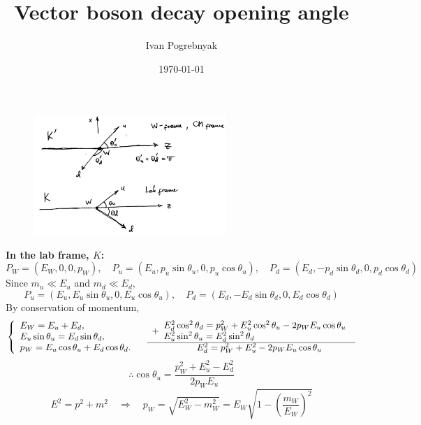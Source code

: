 \documentclass[12pt]{article}
\title{Vector boson decay opening angle}
\author{Ivan Pogrebnyak}
\date{\today}
\begin{document}
\maketitle

\begin{figure}[H]
  \centering
  \includegraphics[width=0.65\textwidth]{fig/fig.png}
\end{figure}

{\bf In the lab frame, $K$:}
\begin{equation}
  P_W = (E_W,0,0,p_W), \quad
  P_u = (E_u,p_u\sin\theta_u,0,p_u\cos\theta_u), \quad
  P_d = (E_d,-p_d\sin\theta_d,0,p_d\cos\theta_d)
\end{equation}
%
Since $m_u\ll E_u$ and $m_d\ll E_d$,
\begin{equation}
  P_u = (E_u,E_u\sin\theta_u,0,E_u\cos\theta_u), \quad
  P_d = (E_d,-E_d\sin\theta_d,0,E_d\cos\theta_d)
\end{equation}
%
By conservation of momentum,
\begin{equation}\label{eq:cons}
  \left\{\begin{array}{l}
    E_W = E_u + E_d, \\
    E_u\sin\theta_u = E_d\sin\theta_d, \\
    p_W = E_u\cos\theta_u + E_d\cos\theta_d.
  \end{array}\right.
  \quad
  \begin{array}{l}
    +\begin{array}{l}
      E_d^2\cos^2\theta_d = p_W^2 + E_u^2\cos^2\theta_u - 2p_WE_u\cos\theta_u \\
      E_u^2\sin^2\theta_u = E_d^2\sin^2\theta_d
    \end{array} \\
    \hline
    \hspace{17mm} E_d^2 = p_W^2 + E_u^2 - 2p_WE_u\cos\theta_u
  \end{array}
\end{equation}
%
\begin{equation}\label{eq:cos}
  \therefore
  \cos\theta_u = \frac{p_W^2 + E_u^2 - E_d^2}{2p_WE_u}
\end{equation}
%
\begin{equation}\label{eq:pW}
  E^2 = p^2 + m^2 \quad \Rightarrow \quad
  p_W = \sqrt{E_W^2-m_W^2} = E_W\sqrt{1 - \left(\frac{m_W}{E_W}\right)^2}
\end{equation}
\end{document}
